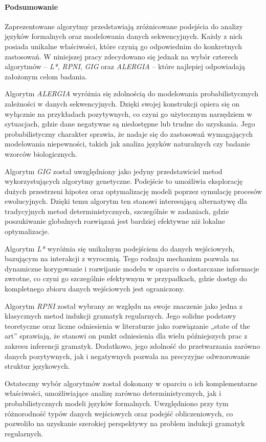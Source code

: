 \paragraph*{Podsumowanie}  
Zaprezentowane algorytmy przedstawiają zróżnicowane podejścia do analizy języków formalnych oraz modelowania danych sekwencyjnych. Każdy z nich posiada unikalne właściwości, które czynią go odpowiednim do konkretnych zastosowań. W niniejszej pracy zdecydowano się jednak na wybór czterech algorytmów – \textit{L*}, \textit{RPNI}, \textit{GIG} oraz \textit{ALERGIA} – które najlepiej odpowiadają założonym celom badania.  

Algorytm \textit{ALERGIA} wyróżnia się zdolnością do modelowania probabilistycznych zależności w danych sekwencyjnych. Dzięki swojej konstrukcji opiera się on wyłącznie na przykładach pozytywnych, co czyni go użytecznym narzędziem w sytuacjach, gdzie dane negatywne są niedostępne lub trudne do uzyskania. Jego probabilistyczny charakter sprawia, że nadaje się do zastosowań wymagających modelowania niepewności, takich jak analiza języków naturalnych czy badanie wzorców biologicznych.  

Algorytm \textit{GIG} został uwzględniony jako jedyny przedstawiciel metod wykorzystujących algorytmy genetyczne. Podejście to umożliwia eksplorację dużych przestrzeni hipotez oraz optymalizację modeli poprzez symulację procesów ewolucyjnych. Dzięki temu algorytm ten stanowi interesującą alternatywę dla tradycyjnych metod deterministycznych, szczególnie w zadaniach, gdzie poszukiwanie globalnych rozwiązań jest bardziej efektywne niż lokalne optymalizacje.  

Algorytm \textit{L*} wyróżnia się unikalnym podejściem do danych wejściowych, bazującym na interakcji z wyrocznią. Tego rodzaju mechanizm pozwala na dynamiczne korygowanie i rozwijanie modelu w oparciu o dostarczane informacje zwrotne, co czyni go szczególnie efektywnym w przypadkach, gdzie dostęp do kompletnego zbioru danych wejściowych jest ograniczony.  

Algorytm \textit{RPNI} został wybrany ze względu na swoje znaczenie jako jedna z klasycznych metod indukcji gramatyk regularnych. Jego solidne podstawy teoretyczne oraz liczne odniesienia w literaturze jako rozwiązanie „state of the art” sprawiają, że stanowi on punkt odniesienia dla wielu późniejszych prac z zakresu inferencji gramatyk. Dodatkowo, jego zdolność do przetwarzania zarówno danych pozytywnych, jak i negatywnych pozwala na precyzyjne odwzorowanie struktur językowych.  

Ostateczny wybór algorytmów został dokonany w oparciu o ich komplementarne właściwości, umożliwiające analizę zarówno deterministycznych, jak i probabilistycznych modeli języków formalnych. Uwzględniono przy tym różnorodność typów danych wejściowych oraz podejść obliczeniowych, co pozwoliło na uzyskanie szerokiej perspektywy na problem indukcji gramatyk regularnych.  

